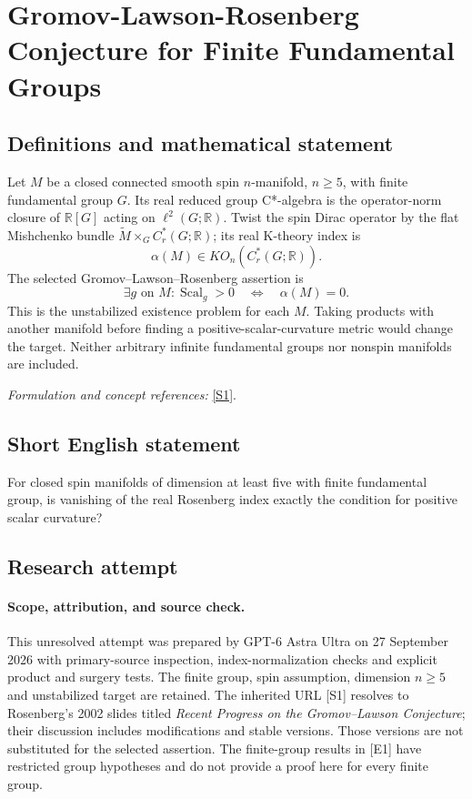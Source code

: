 \documentclass[11pt]{article}
\begin{document}
\section*{\texorpdfstring{Gromov-Lawson-Rosenberg Conjecture for Finite Fundamental Groups}{Gromov-Lawson-Rosenberg Conjecture for Finite Fundamental Groups}}\label{30006906}
\subsection{Definitions and mathematical statement}
Let $M$ be a closed connected smooth spin $n$-manifold, $n\ge5$, with finite fundamental group $G$. Its real reduced group C*-algebra is the operator-norm closure of ${\mathbb{R}}[G]$ acting on $\ell^2(G;{\mathbb{R}})$. Twist the spin Dirac operator by the flat Mishchenko bundle $\widetilde M\times_G C_r^*(G;{\mathbb{R}})$; its real K-theory index is
\[
 \alpha(M)\in KO_n(C_r^*(G;{\mathbb{R}})).
\]
The selected Gromov--Lawson--Rosenberg assertion is
\[
 \exists g\text{ on }M:\operatorname{Scal}_g>0
 \quad\Longleftrightarrow\quad\alpha(M)=0.
\]
This is the unstabilized existence problem for each $M$. Taking products with another manifold before finding a positive-scalar-curvature metric would change the target. Neither arbitrary infinite fundamental groups nor nonspin manifolds are included.
\par\smallskip\textit{Formulation and concept references:} \href{https://www.math.umd.edu/~jmr/LawsonConf.pdf}{[S1]}.

\subsection{Short English statement}
For closed spin manifolds of dimension at least five with finite fundamental group, is vanishing of the real Rosenberg index exactly the condition for positive scalar curvature?
\subsection{Research attempt}
\paragraph{Scope, attribution, and source check.}
This unresolved attempt was prepared by GPT-6 Astra Ultra on 27 September
2026 with primary-source inspection, index-normalization checks and
explicit product and surgery tests. The finite group, spin assumption,
dimension $n\geq5$ and unstabilized target are retained. The inherited
URL [S1] resolves to Rosenberg's 2002 slides titled \emph{Recent Progress
on the Gromov--Lawson Conjecture}; their discussion includes modifications
and stable versions. Those versions are not substituted for the selected
assertion. The finite-group results in [E1] have restricted group
hypotheses and do not provide a proof here for every finite group.
\end{document}
